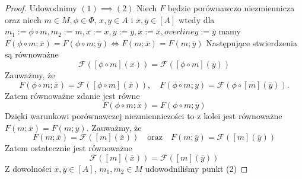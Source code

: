 \documentclass[12pt,a4paper]{report}
\newcommand{\domkniecie}[1]{\left\lbrack{#1}\right\rbrack}
\begin{document}
\begin{proof}
Udowodnimy $(1) \implies (2)$
Niech $F$ będzie porównawczo niezmiennicza oraz niech $m\in M, \phi \in \Phi$, $x, y \in A$ i $\overline{x}, \overline{y} \in \domkniecie{A}$ wtedy dla $m_1:=\phi\circ m, m_2:=m, x:=x, y:=y, \overline{x}:=\overline{x}, overline{y}:=\overline{y}$ mamy $F(\phi\circ m;\overline{x})=F(\phi\circ m;\overline{y}) \iff F(m;\overline{x})=F(m;\overline{y})$
Następujące stwierdzenia są równoważne
$$
\mathcal{F}(\domkniecie{\phi \circ m}(\overline{x}))=\mathcal{F}(\domkniecie{\phi \circ m}(\overline{y}))
$$
Zauważmy, że
$$
F(\phi \circ m;\overline{x})=\mathcal{F}( \domkniecie{\phi \circ m}(\overline{x})), \quad F(\phi \circ m;y)=\mathcal{F}(\phi\circ \domkniecie{m}(\overline{y})).
$$
Zatem równoważne zdanie jest równe 
$$
F(\phi\circ m;\overline{x})=F(\phi \circ m;\overline{y})
$$
Dzięki warunkowi porównawczej niezmienniczości to z kolei jest równoważne
$F(m;\overline{x})=F(m;\overline{y})$.
Zauważmy, że 
$$
F(m;\overline{x})=\mathcal{F}(\domkniecie{m}(\overline{x})) \quad \textrm{oraz} \quad F(m;\overline{y})=\mathcal{F}(\domkniecie{m}(\overline{y}))
$$
Zatem ostatecznie jest równoważne 
$$
\mathcal{F}(\domkniecie{m}(\overline{x}))=\mathcal{F}(\domkniecie{m}(\overline{y}))
$$
Z dowolności $\overline{x}, \overline{y} \in \domkniecie{A}$, $m_1, m_2 \in M$ udowodniliśmy punkt (2)


\end{proof}
\end{document}

